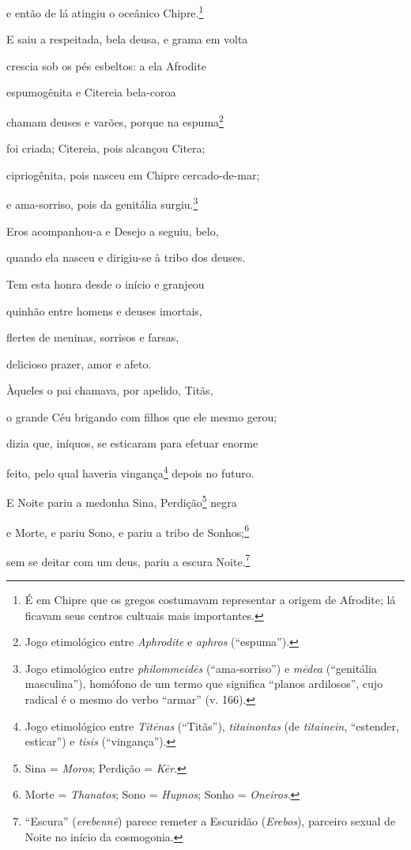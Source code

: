 \begin{pages}
\begin{Rightside}
e então de lá atingiu o oceânico Chipre.\footnote{É em Chipre que os gregos costumavam representar a origem de Afrodite; lá ficavam seus centros cultuais mais importantes.}

E saiu a respeitada, bela deusa, e grama em volta

crescia sob os pés esbeltos: a ela Afrodite 

espumogênita e Citereia bela-coroa

chamam deuses e varões, porque na espuma\footnote{Jogo etimológico entre \emph{Aphrodite} e \emph{aphros} (``espuma'').}

foi criada; Citereia, pois alcançou Citera;

cipriogênita, pois nasceu em Chipre cercado-de-mar;

e ama-sorriso, pois da genitália surgiu.\footnote{Jogo etimológico entre \emph{philommeidēs} (``ama-sorriso'') e
\emph{mēdea} (``genitália masculina''), homófono de um termo que
significa ``planos ardilosos'', cujo radical é o mesmo do verbo
``armar'' (v. 166).} 

Eros acompanhou-a e Desejo a seguiu, belo,

quando ela nasceu e dirigiu-se à tribo dos deuses.

Tem esta honra desde o início e granjeou

quinhão entre homens e deuses imortais,

flertes de meninas, sorrisos e farsas, 

delicioso prazer, amor e afeto.

\quad{}Àqueles o pai chamava, por apelido, Titãs,

o grande Céu brigando com filhos que ele mesmo gerou;

dizia que, iníquos, se esticaram para efetuar enorme

feito, pelo qual haveria vingança\footnote{Jogo etimológico entre \emph{Titēnas} (``Titãs''),
\emph{titainontas} (de \emph{titainein}, ``estender, esticar'') e
\emph{tisis} (``vingança'').} depois no futuro. 

\quad{}E Noite pariu a medonha Sina, Perdição\footnote{Sina = \emph{Moros}; Perdição = \emph{Kēr}.} negra

e Morte, e pariu Sono, e pariu a tribo de Sonhos;\footnote{Morte = \emph{Thanatos}; Sono = \emph{Hupnos}; Sonho = \emph{Oneiros}.}

sem se deitar com um deus, pariu a escura Noite.\footnote{``Escura'' (\emph{erebennē}) parece remeter a Escuridão (\emph{Erebos}), parceiro sexual de Noite no início da cosmogonia.}


\end{Rightside}
\end{pages}
